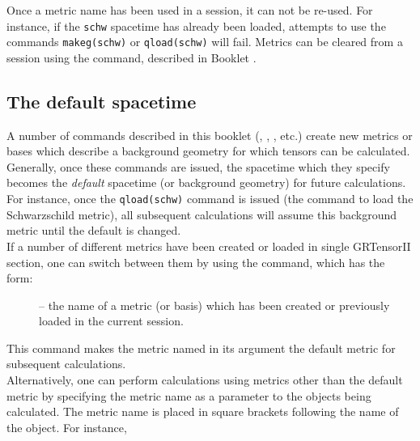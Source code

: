 \documentclass{article}
\begin{document}
Once a metric name has been used in a session, it can not be
re-used. For instance, if the \texttt{schw} spacetime has already been
loaded, attempts to use the commands \texttt{makeg(schw)} or
\texttt{qload(schw)} will fail. Metrics can be cleared from a session
using the  command, described in Booklet \grCalcRef.
%
\subsection{The default spacetime} \label{sec:default}
%
A number of commands described in this booklet (,
, , etc.) create new metrics or bases
which describe a background geometry for which tensors can be
calculated. Generally, once these commands are issued, the spacetime
which they specify becomes the \textit{default} spacetime (or
background geometry) for future calculations. For instance, once the
\mbox{\texttt{qload(schw)}} command is issued (the command to load
the Schwarzschild metric), all subsequent calculations will assume
this background metric until the default is changed.\\

If a number of different metrics have been created or loaded in single
GRTensorII section, one can switch between them by using the 
command, which has the form:\\
%
\begin{cmdspec}
  \label{spec:grmetric}

  \begin{description}
    \item[] -- the name of a metric (or basis) which has been
      created or previously loaded in the current session.
  \end{description}

\end{cmdspec}

This command makes the metric named in its argument the default metric
for subsequent calculations.\\

Alternatively, one can perform calculations using metrics other than
the default metric by specifying the metric name as a parameter to the
objects being calculated. The metric name is placed in square brackets
following the name of the object. For instance,\\
\end{document}
